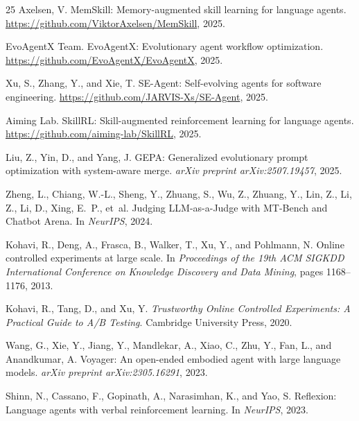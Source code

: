 \documentclass{article}
\begin{document}
\begin{thebibliography}{25}
Axelsen, V.
\newblock MemSkill: Memory-augmented skill learning for language agents.
\newblock \url{https://github.com/ViktorAxelsen/MemSkill}, 2025.

EvoAgentX Team.
\newblock EvoAgentX: Evolutionary agent workflow optimization.
\newblock \url{https://github.com/EvoAgentX/EvoAgentX}, 2025.

Xu, S., Zhang, Y., and Xie, T.
\newblock SE-Agent: Self-evolving agents for software engineering.
\newblock \url{https://github.com/JARVIS-Xs/SE-Agent}, 2025.

Aiming Lab.
\newblock SkillRL: Skill-augmented reinforcement learning for language agents.
\newblock \url{https://github.com/aiming-lab/SkillRL}, 2025.

Liu, Z., Yin, D., and Yang, J.
\newblock GEPA: Generalized evolutionary prompt optimization with system-aware merge.
\newblock \emph{arXiv preprint arXiv:2507.19457}, 2025.

Zheng, L., Chiang, W.-L., Sheng, Y., Zhuang, S., Wu, Z., Zhuang, Y., Lin, Z., Li, Z., Li, D., Xing, E.~P., et~al.
\newblock Judging {LLM}-as-a-Judge with {MT}-Bench and Chatbot Arena.
\newblock In \emph{NeurIPS}, 2024.

Kohavi, R., Deng, A., Frasca, B., Walker, T., Xu, Y., and Pohlmann, N.
\newblock Online controlled experiments at large scale.
\newblock In \emph{Proceedings of the 19th ACM SIGKDD International Conference on Knowledge Discovery and Data Mining}, pages 1168--1176, 2013.

Kohavi, R., Tang, D., and Xu, Y.
\newblock \emph{Trustworthy Online Controlled Experiments: A Practical Guide to A/B Testing}.
\newblock Cambridge University Press, 2020.

Wang, G., Xie, Y., Jiang, Y., Mandlekar, A., Xiao, C., Zhu, Y., Fan, L., and Anandkumar, A.
\newblock Voyager: An open-ended embodied agent with large language models.
\newblock \emph{arXiv preprint arXiv:2305.16291}, 2023.

Shinn, N., Cassano, F., Gopinath, A., Narasimhan, K., and Yao, S.
\newblock Reflexion: Language agents with verbal reinforcement learning.
\newblock In \emph{NeurIPS}, 2023.


\end{thebibliography}
\end{document}

